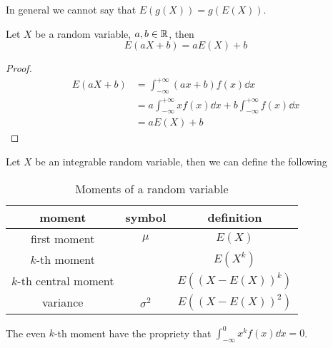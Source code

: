 \documentclass[14pt]{extarticle}
\begin{document}
\begin{remark}
    In general we cannot say that $E(g(X)) = g(E(X))$.
\end{remark}

\begin{theorem}
    Let $X$ be a random variable, $a, b \in \mathbb{R}$, then
    \begin{equation}
        E(aX + b) = aE(X) + b
    \end{equation}
\end{theorem}

\begin{proof}
    \skiplineafterproof
    \begin{align}
        E(aX + b) & = \int_{-\infty}^{+\infty} (ax + b) f(x) \dd{x}                                     \\
                  & = a \int_{-\infty}^{+\infty} x f(x) \dd{x} + b \int_{-\infty}^{+\infty} f(x) \dd{x} \\
                  & = aE(X) + b
    \end{align}
\end{proof}

\begin{definition}[moment]
    Let $X$ be an integrable random variable, then we can define the following

    \begin{table}[H]
        \centering
        \begin{tabular}{|c|c|c|}
            \hline
            \textbf{moment}       & \textbf{symbol} & \textbf{definition} \\
            \hline
            first moment          & $\mu$           & $E(X)$              \\
            $k$-th moment         &                 & $E(X^k)$            \\
            $k$-th central moment &                 & $E((X - E(X))^k)$   \\
            variance              & $\sigma^2$      & $E((X - E(X))^2)$   \\
            \hline
        \end{tabular}

        \caption{Moments of a random variable}
        \label{tab:moments}
    \end{table}

    The even $k$-th moment have the propriety that $\int_{-\infty}^0 x^k f(x) \dd{x} = 0$.
\end{definition}
\end{document}
